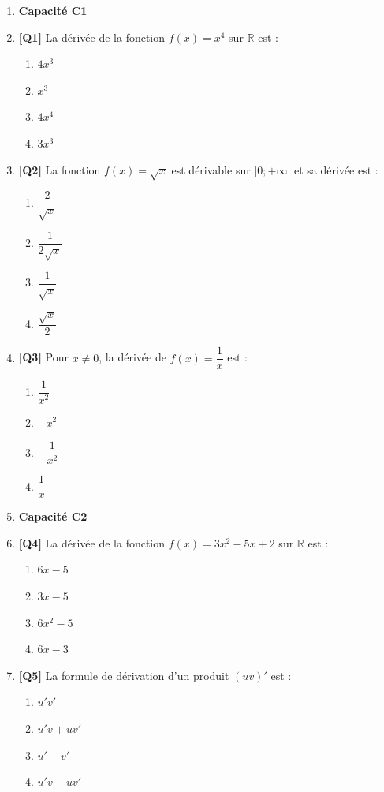 \begin{enumerate}

\item[] \textbf{Capacité C1}

\item \textbf{[Q1]} La dérivée de la fonction $f(x) = x^4$ sur $\mathbb{R}$ est :
  \begin{enumerate}[label=\Alph*.]
    \item $4x^3$
    \item $x^3$
    \item $4x^4$
    \item $3x^3$
  \end{enumerate}

\item \textbf{[Q2]} La fonction $f(x) = \sqrt{x}$ est dérivable sur $]0 ; +\infty[$ et sa dérivée est :
  \begin{enumerate}[label=\Alph*.]
    \item $\dfrac{2}{\sqrt{x}}$
    \item $\dfrac{1}{2\sqrt{x}}$
    \item $\dfrac{1}{\sqrt{x}}$
    \item $\dfrac{\sqrt{x}}{2}$
  \end{enumerate}

\item \textbf{[Q3]} Pour $x \neq 0$, la dérivée de $f(x) = \dfrac{1}{x}$ est :
  \begin{enumerate}[label=\Alph*.]
    \item $\dfrac{1}{x^2}$
    \item $-x^2$
    \item $-\dfrac{1}{x^2}$
    \item $\dfrac{1}{x}$
  \end{enumerate}

\item[] \textbf{Capacité C2}

\item \textbf{[Q4]} La dérivée de la fonction $f(x) = 3x^2 - 5x + 2$ sur $\mathbb{R}$ est :
  \begin{enumerate}[label=\Alph*.]
    \item $6x - 5$
    \item $3x - 5$
    \item $6x^2 - 5$
    \item $6x - 3$
  \end{enumerate}

\item \textbf{[Q5]} La formule de dérivation d'un produit $(uv)'$ est :
  \begin{enumerate}[label=\Alph*.]
    \item $u'v'$
    \item $u'v + uv'$
    \item $u' + v'$
    \item $u'v - uv'$
  \end{enumerate}


\end{enumerate}
